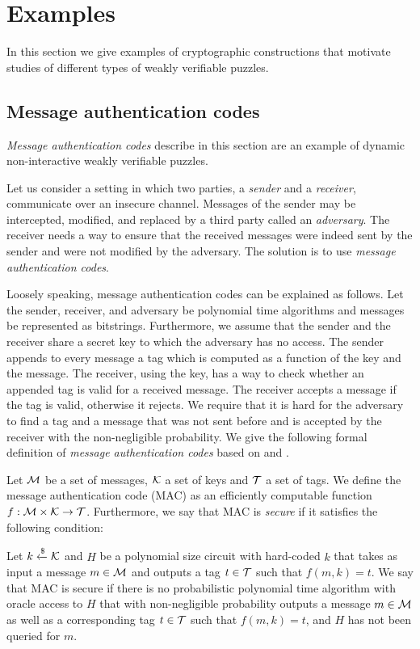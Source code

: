 \section{Examples}
\label{section:wvp_examples}
In this section we give examples of cryptographic constructions that motivate studies of different types of weakly verifiable puzzles.

\subsection{Message authentication codes}
\textit{Message authentication codes} describe in this section are
an example of dynamic non-interactive weakly verifiable puzzles.

Let us consider a setting in which two parties, a \textit{sender} and a \textit{receiver}, communicate over an insecure channel.
Messages of the sender may be intercepted, modified, and replaced by a third party called an \textit{adversary}.
The receiver needs a way to ensure that the received messages were indeed sent by the sender and were not modified by the adversary.
The solution is to use \textit{message authentication codes}.

Loosely speaking, message authentication codes can be explained as follows.
Let the sender, receiver, and adversary be polynomial time algorithms and messages be represented as bitstrings.
Furthermore, we assume that the sender and the receiver share a secret key to which the adversary has no access.
The sender appends to every message a tag which is computed as a function of the key and the message.
The receiver, using the key, has a way to check whether an appended tag is valid for a received message.
The receiver accepts a message if the tag is valid, otherwise it rejects.
We require that it is hard for the adversary to find a tag and a message that was not sent before and is
accepted by the receiver with the non-negligible probability. We give the following formal definition
of \textit{message authentication codes} based on \cite{LectureNotesCrypo} and \cite{Goldreich:2004:FCV:975541}.
\begin{definition}
  \label{def:mac}
  Let $\mathcal{M}$ be a set of messages, $\mathcal{K}$ a set of keys and $\mathcal{T}$ a set of tags.
  We define the \textnormal{message authentication code (MAC)} as an efficiently computable function $f:\mathcal{M} \times \mathcal{K} \rightarrow \mathcal{T}$.
  Furthermore, we say that MAC is \textit{secure} if it satisfies the following condition:

  Let $k \xleftarrow{\$} \mathcal{K}$ and $H$ be a polynomial size circuit with hard-coded $k$ that takes as input a message $m \in \mathcal{M}$ and outputs a tag $t \in \mathcal{T}$
  such that $f(m,k) = t$. We say that MAC is secure if there is no probabilistic polynomial time algorithm
  with oracle access to $H$ that with non-negligible probability outputs a message $m \in \mathcal{M}$
  as well as a corresponding tag $t \in \mathcal{T}$ such that $f(m, k) = t$, and $H$ has not been queried for $m$.
\end{definition}

